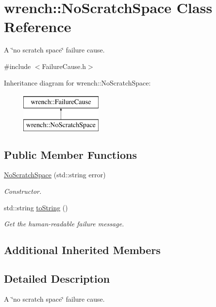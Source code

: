 \hypertarget{classwrench_1_1_no_scratch_space}{}\section{wrench\+:\+:No\+Scratch\+Space Class Reference}
\label{classwrench_1_1_no_scratch_space}


A \char`\"{}no scratch space\char`\"{} failure cause.  




{\ttfamily \#include $<$Failure\+Cause.\+h$>$}

Inheritance diagram for wrench\+:\+:No\+Scratch\+Space\+:\begin{figure}[H]
\begin{center}
\leavevmode
\includegraphics[height=2.000000cm]{classwrench_1_1_no_scratch_space}
\end{center}
\end{figure}
\subsection*{Public Member Functions}
\begin{DoxyCompactItemize}
\item 
\hyperlink{classwrench_1_1_no_scratch_space_a42f786f73e3ddce5921b90a6da828804}{No\+Scratch\+Space} (std\+::string error)
\begin{DoxyCompactList}\small\item\em Constructor. \end{DoxyCompactList}\item 
std\+::string \hyperlink{classwrench_1_1_no_scratch_space_add628f91104786a99a410ec07abac54c}{to\+String} ()
\begin{DoxyCompactList}\small\item\em Get the human-\/readable failure message. \end{DoxyCompactList}\end{DoxyCompactItemize}
\subsection*{Additional Inherited Members}


\subsection{Detailed Description}
A \char`\"{}no scratch space\char`\"{} failure cause. 

